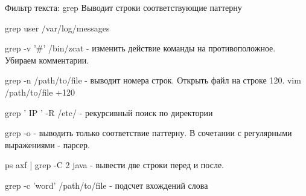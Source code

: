 \begin{frame}[fragile]{Фильтр текста: grep}
Выводит строки соответствующие паттерну

grep \alert{user} /var/log/messages

grep \alert{-v} '#' /bin/zcat - изменить действие команды на противоположное. Убираем комментарии.

grep \alert{-n} /path/to/file - выводит номера строк. Открыть файл на строке 120. vim /path/to/file +120

grep ' IP ' \alert{-R} /etc/ - рекурсивный поиск по директории

grep -o   - выводить только соответствие паттерну. В сочетании с регулярными выражениями - парсер.

ps axf | grep \alert{-C 2} java - вывести две строки перед и после.

grep \alert{-c} 'word' /path/to/file - подсчет вхождений слова
    
\end{frame}
